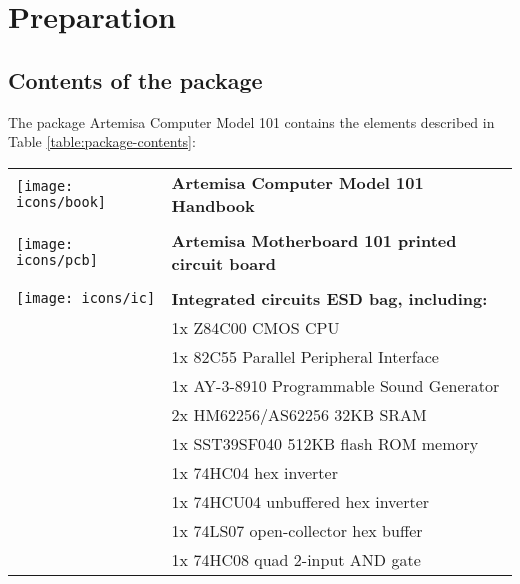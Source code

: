 \chapter{Preparation}

\section{Contents of the package}

The package Artemisa Computer Model 101 contains the elements described in Table \ref{table:package-contents}:

\begin{longtable}{m{10mm}|l}
	\centering
	\texttt{[image: icons/book]}          & {\bf Artemisa Computer Model 101 Handbook}                  \\
	                                      &                                                             \\
	\texttt{[image: icons/pcb]}           & {\bf Artemisa Motherboard 101 printed circuit board}        \\
	                                      &                                                             \\
	\texttt{[image: icons/ic]}            & {\bf Integrated circuits ESD bag, including:}               \\
	                                      & 1x Z84C00 CMOS CPU                                          \\
	                                      & 1x 82C55 Parallel Peripheral Interface                      \\			
	                                      & 1x AY-3-8910 Programmable Sound Generator                   \\
	                                      & 2x HM62256/AS62256 32KB SRAM                                \\
	                                      & 1x SST39SF040 512KB flash ROM memory                        \\
	                                      & 1x 74HC04 hex inverter                                      \\
	                                      & 1x 74HCU04 unbuffered hex inverter                          \\
	                                      & 1x 74LS07 open-collector hex buffer                         \\
	                                      & 1x 74HC08 quad 2-input AND gate                             \\

\end{longtable}
